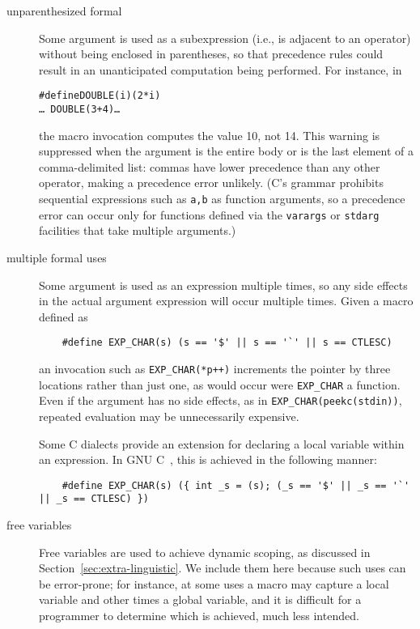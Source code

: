 \documentclass[10pt]{article}
\begin{document}
\begin{description}
\item[unparenthesized formal]
        Some argument is used as a subexpression (i.e., is adjacent to an
        operator) without being enclosed in parentheses, so that precedence
        rules could result in an unanticipated computation being performed.
        For instance, in
\begin{alltt}
    #define DOUBLE(i) (2*i)
    \ldots\ DOUBLE(3+4) \ldots
\end{alltt}
        the macro invocation computes the value 10, not 14.
        This warning is suppressed when the argument is the entire body
        or is the last element of a comma-delimited list:  commas have
        lower precedence than any other operator, making a precedence error
        unlikely.
        (C's grammar prohibits sequential expressions such as {\tt a,b} as
        function arguments, so a precedence error can occur only for
        functions defined via the {\tt varargs} or {\tt stdarg} facilities
        that take multiple arguments.)

\item[multiple formal uses]
  Some argument is used as an expression multiple times, so any side
  effects in the actual argument expression will occur multiple times.
  Given a macro defined as
\begin{verbatim}
    #define EXP_CHAR(s) (s == '$' || s == '`' || s == CTLESC)
\end{verbatim}
  an invocation such as {\tt \verb|EXP_CHAR|(*p++)} increments the pointer
  by three locations rather than just one, as would occur
  were \verb|EXP_CHAR| a function.  Even if the argument has no side
  effects, as in {\tt \verb|EXP_CHAR|(peekc(stdin))}, repeated evaluation may be
  unnecessarily expensive.
        
  Some C dialects provide an extension for declaring a local variable
  within an expression.  In GNU C~\cite{GCC}, this is achieved in the
  following manner:
\begin{verbatim}
    #define EXP_CHAR(s) ({ int _s = (s); (_s == '$' || _s == '`' || _s == CTLESC) })
\end{verbatim}

\item[free variables]
  Free variables are used to achieve dynamic scoping, as discussed in
  Section~\ref{sec:extra-linguistic}.  We include them here because such
  uses can be error-prone; for instance, at some uses a macro may capture a
  local variable and other times a global variable, and it is difficult for
  a programmer to determine which is achieved, much less intended.


\end{description}
\end{document}
